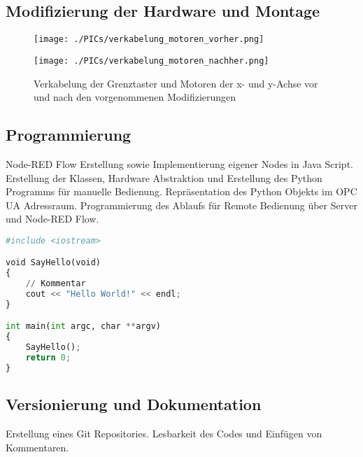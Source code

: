 \documentclass[BMR,Bachelor,ngerman]{twbook}%
\begin{document}
\subsection{Modifizierung der Hardware und Montage}
\begin{figure}[H]%
        		\begin{minipage}[t]{\linewidth}%
			\begin{minipage}{0.5\linewidth}
				\begin{center}%
           				\texttt{[image: ./PICs/verkabelung\_motoren\_vorher.png]}%
				\end{center}%
			\end{minipage}
			\begin{minipage}{0.5\linewidth}
				\begin{center}
           				\texttt{[image: ./PICs/verkabelung\_motoren\_nachher.png]}%
				\end{center}%
			\end{minipage}
			\caption{Verkabelung der Grenztaster und Motoren der x- und y-Achse vor und nach den vorgenommenen Modifizierungen}%
			\label{fig:HWmodified}%
        		\end{minipage}%
\end{figure}%
%
\subsection{Programmierung}
Node-RED Flow Erstellung sowie Implementierung eigener Nodes in Java Script.
Erstellung der Klassen, Hardware Abstraktion und Erstellung des Python Programms für manuelle Bedienung. Repräsentation des Python Objekts im OPC UA Adressraum. Programmierung des Ablaufs für Remote Bedienung über Server und Node-RED Flow.
\begin{lstlisting}[language=Python,name={2. Beispiel},label={sc:bsp:2}]
#include <iostream>

void SayHello(void)
{
    // Kommentar
    cout << "Hello World!" << endl;
}

int main(int argc, char **argv)
{
    SayHello();
    return 0;
}
\end{lstlisting}
\subsection{Versionierung und Dokumentation}
Erstellung eines Git Repositories. Lesbarkeit des Codes und Einfügen von Kommentaren.
\end{document}

